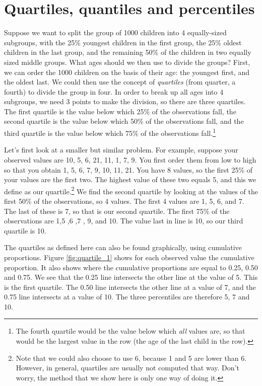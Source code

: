 \documentclass[]{report}\usepackage[]{graphicx}\usepackage[]{color}
\begin{document}
\section{Quartiles, quantiles and percentiles}

Suppose we want to split the group of 1000 children into 4 equally-sized subgroups, with the 25\% youngest children in the first group, the 25\% oldest children in the last group, and the remaining 50\% of the children in two equally sized middle groups. What ages should we then use to divide the groups? First, we can order the 1000 children on the basis of their age: the youngest first, and the oldest last. We could then use the concept of \textit{quartiles} (from quarter, a fourth) to divide the group in four. In order to break up all ages into 4 subgroups, we need 3 points to make the division, so there are three quartiles. The first quartile is the value below which 25\% of the observations fall, the second quartile is the value below which 50\% of the observations fall, and the third quartile is the value below which 75\% of the observations fall.\footnote{The fourth quartile would be the value below which \textit{all} values are, so that would be the largest value in the row (the age of the last child in the row).}

Let's first look at a smaller but similar problem. For example, suppose your observed values are {10, 5, 6, 21, 11, 1, 7, 9}. You first order them from low to high so that you obtain {1, 5, 6, 7, 9, 10, 11, 21}. You have 8 values, so the first 25\% of your values are the first two. The highest value of these two equals 5, and this we define as our quartile.\footnote{Note that we could also choose to use 6,
because 1 and 5 are lower than 6. However, in general, quartiles are usually not computed that way. Don't worry, the method that we show here is only one way of doing it.} We find the second quartile by looking at the values of the first 50\% of the observations, so 4 values. The first 4 values are 1, 5, 6, and 7. The last of these is 7, so that is our second quartile. The first 75\% of the observations are 1,5 ,6 ,7 , 9, and 10. The value last in line is 10, so our third quartile is 10.

The quartiles as defined here can also be found graphically, using cumulative proportions. Figure \ref{fig:quartile_1} shows for each observed value the cumulative proportion. It also shows where the cumulative proportions are equal to 0.25, 0.50 and 0.75. We see that the 0.25 line intersects the other line at the value of 5. This is the first quartile. The 0.50 line intersects the other line at a value of 7, and the 0.75 line intersects at a value of 10. The three percentiles are therefore 5, 7 and 10.
\end{document}
